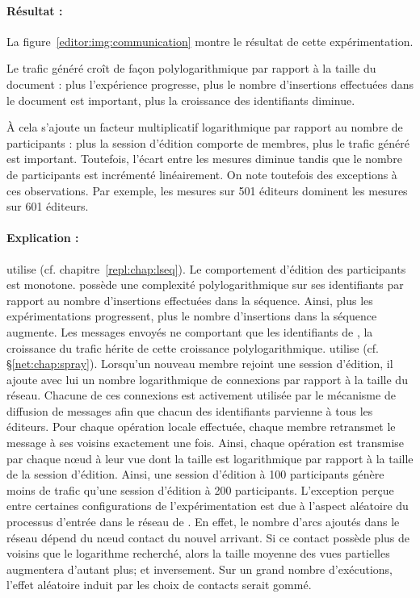 \paragraph{Résultat :} La figure~\ref{editor:img:communication} montre le
résultat de cette expérimentation.
\begin{inparaenum}[(i)]
\item Le trafic généré croît de façon polylogarithmique par rapport à la taille
  du document : plus l'expérience progresse, plus le nombre d'insertions
  effectuées dans le document est important, plus la croissance des identifiants
  diminue.
\item À cela s'ajoute un facteur multiplicatif logarithmique par rapport au
  nombre de participants : plus la session d'édition comporte de membres, plus
  le trafic généré est important. Toutefois, l'écart entre les mesures diminue
  tandis que le nombre de participants est incrémenté linéairement. On note
  toutefois des exceptions à ces observations. Par exemple, les mesures sur 501
  éditeurs dominent les mesures sur 601 éditeurs.
\end{inparaenum}

\paragraph{Explication :} \CRATE utilise \LSEQ
(cf. chapitre~\ref{repl:chap:lseq}). Le comportement d'édition des participants
est monotone. \LSEQ possède une complexité polylogarithmique sur ses
identifiants par rapport au nombre d'insertions effectuées dans la
séquence. Ainsi, plus les expérimentations progressent, plus le nombre
d'insertions dans la séquence augmente. Les messages envoyés ne comportant que
les identifiants de \LSEQ, la croissance du trafic hérite de cette croissance
polylogarithmique. \CRATE utilise \SPRAY (cf. §\ref{net:chap:spray}). Lorsqu'un
nouveau membre rejoint une session d'édition, il ajoute avec lui un nombre
logarithmique de connexions par rapport à la taille du réseau. Chacune de ces
connexions est activement utilisée par le mécanisme de diffusion de messages
afin que chacun des identifiants parvienne à tous les éditeurs. Pour chaque
opération locale effectuée, chaque membre retransmet le message à ses voisins
exactement une fois. Ainsi, chaque opération est transmise par chaque nœud à
leur vue dont la taille est logarithmique par rapport à la taille de la session
d'édition. Ainsi, une session d'édition à 100 participants génère moins de
trafic qu'une session d'édition à 200 participants. L'exception perçue entre
certaines configurations de l'expérimentation est due à l'aspect aléatoire du
processus d'entrée dans le réseau de \SPRAY. En effet, le nombre d'arcs ajoutés
dans le réseau dépend du nœud contact du nouvel arrivant. Si ce contact possède
plus de voisins que le logarithme recherché, alors la taille moyenne des vues
partielles augmentera d'autant plus; et inversement.  Sur un grand nombre
d'exécutions, l'effet aléatoire induit par les choix de contacts serait gommé.



